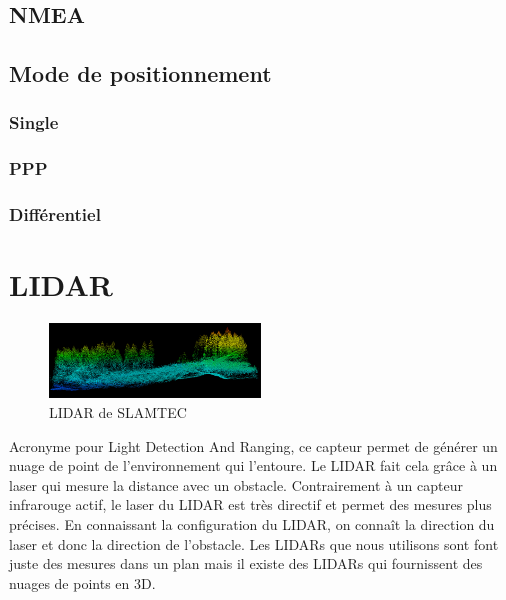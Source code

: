 \documentclass[a4paper, 11pt]{report}
\begin{document}
\subsection{NMEA}

\subsection{Mode de positionnement}

\subsubsection{Single}

\subsubsection{PPP}

\subsubsection{Différentiel}


\section{LIDAR}

\begin{figure}[h!]
\begin{centering}
\includegraphics[width=0.5\textwidth]{images/NuageDePoints.png}
\caption{LIDAR de SLAMTEC}
\par\end{centering}
\end{figure}

Acronyme pour Light Detection And Ranging, ce capteur permet de générer un nuage de point de l'environnement qui l'entoure. Le LIDAR fait cela grâce à un laser qui mesure la distance avec un obstacle. Contrairement à un capteur infrarouge actif, le laser du LIDAR est très directif et permet des mesures plus précises. En connaissant la configuration du LIDAR, on connaît la direction du laser et donc la direction de l'obstacle. Les LIDARs que nous utilisons sont font juste des mesures dans un plan mais il existe des LIDARs qui fournissent des nuages de points en 3D.
\end{document}
